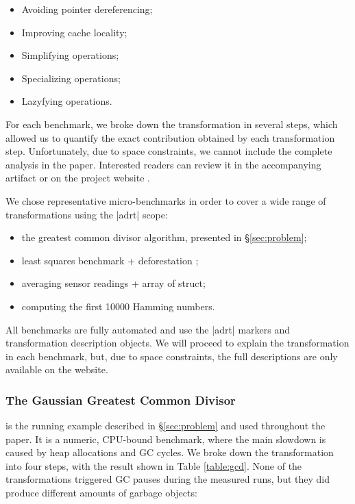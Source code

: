 \begin{itemize}
  \item Avoiding pointer dereferencing;
  \item Improving cache locality;
  \item Simplifying operations;
  \item Specializing operations;
  \item Lazyfying operations.
\end{itemize}


\noindent
For each benchmark, we broke down the transformation in several steps, which allowed us to quantify the exact contribution obtained by each transformation step. Unfortunately, due to space constraints, we cannot include the complete analysis in the paper. Interested readers can review it in the accompanying artifact or on the project website \cite{ildl-plugin-wiki}.


\noindent
We chose representative micro-benchmarks in order to cover a wide range of transformations using the |adrt| scope:

\begin{itemize}
\item the greatest common divisor algorithm, presented in \S\ref{sec:problem};
\item least squares benchmark + deforestation \cite{wadler-deforestation};
\item averaging sensor readings + array of struct;
\item computing the first 10000 Hamming numbers.
\end{itemize}


\noindent
All benchmarks are fully automated and use the |adrt| markers and transformation description objects. We will proceed to explain the transformation in each benchmark, but, due to space constraints, the full descriptions are only available on the website.

\subsubsection{The Gaussian Greatest Common Divisor}
is the running example described in \S\ref{sec:problem} and used throughout the paper. It is a numeric, CPU-bound benchmark, where the main slowdown is caused by heap allocations and GC cycles. We broke down the transformation into four steps, with the result shown in Table \ref{table:gcd}. None of the transformations triggered GC pauses during the measured runs, but they did produce different amounts of garbage objects:


